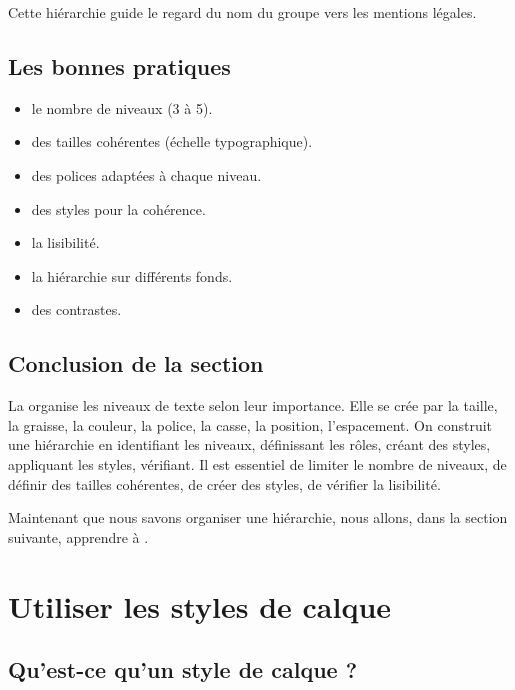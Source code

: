 Cette hiérarchie guide le regard du nom du groupe vers les mentions légales.

\subsection{Les bonnes pratiques}

\begin{itemize}
    \item {} le nombre de niveaux (3 à 5).
    \item {} des tailles cohérentes (échelle typographique).
    \item {} des polices adaptées à chaque niveau.
    \item {} des styles pour la cohérence.
    \item {} la lisibilité.
    \item {} la hiérarchie sur différents fonds.
    \item {} des contrastes.
\end{itemize}

\subsection*{Conclusion de la section}

La  organise les niveaux de texte selon leur importance. Elle se crée par la taille, la graisse, la couleur, la police, la casse, la position, l'espacement. On construit une hiérarchie en identifiant les niveaux, définissant les rôles, créant des styles, appliquant les styles, vérifiant. Il est essentiel de limiter le nombre de niveaux, de définir des tailles cohérentes, de créer des styles, de vérifier la lisibilité.

Maintenant que nous savons organiser une hiérarchie, nous allons, dans la section suivante, apprendre à .

\section{Utiliser les styles de calque}

\subsection{Qu'est-ce qu'un style de calque ?}

